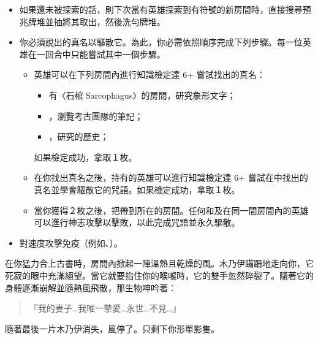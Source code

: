 \vspace*{-1em}
\begin{itemize}
  \item 如果還未被探索的話，則下次當有英雄探索到有\OmenSymbol{}符號的新房間時，直接搜尋預兆牌堆並抽將其取出，然後洗勻牌堆。
  \item 你必須說出的真名以驅散它。為此，你必需依照順序完成下列步驟。每一位英雄在一回合中只能嘗試其中一個步驟。
        \begin{itemize}
          \item 英雄可以在下列房間內進行知識檢定達 6+ 嘗試找出的真名：
                \begin{itemize}
                  \item 有〈石棺 Sarcophagus〉的房間，研究象形文字；
                  \item {}，瀏覽考古團隊的筆記；
                  \item {}，研究的歷史；
                \end{itemize}
                如果檢定成功，拿取１枚。
          \item 在你找出真名之後，持有的英雄可以進行知識檢定達 6+ 嘗試在中找出的真名並學會驅散它的咒語。如果檢定成功，拿取１枚。
          \item 當你獲得２枚之後，把帶到所在的房間。任何和及在同一間房間內的英雄可以進行神志攻擊以擊敗，以此完成咒語並永久驅散。
        \end{itemize}
  \item {}對速度攻擊免疫（例如、）。
\end{itemize}

\begin{HauntStory}
  在你猛力合上古書時，房間內掀起一陣溫熱且乾燥的風。木乃伊蹣跚地走向你，它死寂的眼中充滿絕望。當它就要掐住你的喉嚨時，它的雙手忽然碎裂了。隨著它的身體逐漸崩解並隨熱風飛散，那生物呻吟著：
  \begin{quote}
    『我的妻子…我唯一摰愛…永世…不見…』
  \end{quote}
  隨著最後一片木乃伊消失，風停了。只剩下你形單影隻。
\end{HauntStory}
